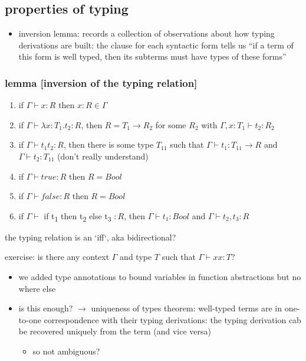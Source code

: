 \documentclass[11pt]{article}
\begin{document}
\subsection{properties of typing}
\label{sec:org149403c}
\begin{itemize}
\item inversion lemma: records a collection of observations about how typing derivations are built: the clause for each syntactic form tells us ``if a term of this form is well typed, then its subterms must have types of these forms''
\end{itemize}

\subsubsection{lemma [inversion of the typing relation]}
\label{sec:org3cb47f3}
\begin{enumerate}
\item if \(\Gamma \vdash x : R\) then \(x:R \in \Gamma\)
\item if \(\Gamma \vdash \lambda x : T_1 . t_2 : R\), then \(R = T_1 \rightarrow R_2\) for some \(R_2\) with \(\Gamma, x: T_1 \vdash t_2 : R_2\)
\item if \(\Gamma \vdash t_1 t_2 : R\), then there is some type \(T_{11}\) such that \(\Gamma \vdash t_1 : T_{11} \rightarrow R\) and \(\Gamma \vdash t_2 : T_{11}\) (don't really understand)
\item if \(\Gamma \vdash true : R\) then \(R = Bool\)
\item if \(\Gamma \vdash false : R\) then \(R = Bool\)
\item if
\(\Gamma \vdash\) if t\textsubscript{1} then t\textsubscript{2} else t\textsubscript{3} \(: R\), then \(\Gamma \vdash t_1 : Bool\) and \(\Gamma \vdash t_2, t_3 : R\)
\end{enumerate}

the typing relation is an `iff`, aka bidirectional?

exercise: is there any context \(\Gamma\) and type \(T\) such that \(\Gamma \vdash x x :T\)?

\begin{itemize}
\item we added type annotations to bound variables in function abstractions but no where else
\item is this enough? \(\rightarrow\) uniqueness of types theorem: well-typed terms are in one-to-one correspondence with their typing derivations: the typing derivation cab be recovered uniquely from the term (and vice versa)
\begin{itemize}
\item so not ambiguous?
\end{itemize}
\end{itemize}
\end{document}
